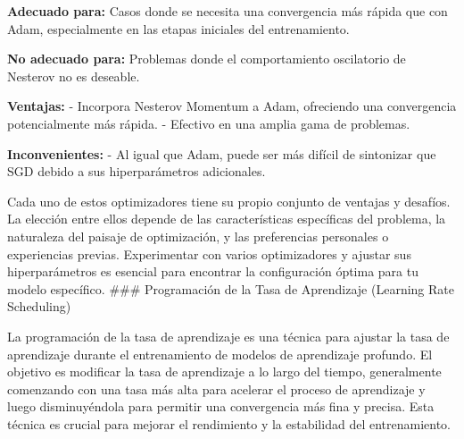 \documentclass[11pt]{article}
\begin{document}
\textbf{Adecuado para:} Casos donde se necesita una convergencia más rápida que
con Adam, especialmente en las etapas iniciales del entrenamiento.

\textbf{No adecuado para:} Problemas donde el comportamiento oscilatorio de
Nesterov no es deseable.

\textbf{Ventajas:} - Incorpora Nesterov Momentum a Adam, ofreciendo una
convergencia potencialmente más rápida. - Efectivo en una amplia gama de
problemas.

\textbf{Inconvenientes:} - Al igual que Adam, puede ser más difícil de
sintonizar que SGD debido a sus hiperparámetros adicionales.

Cada uno de estos optimizadores tiene su propio conjunto de ventajas y
desafíos. La elección entre ellos depende de las características
específicas del problema, la naturaleza del paisaje de optimización, y
las preferencias personales o experiencias previas. Experimentar con
varios optimizadores y ajustar sus hiperparámetros es esencial para
encontrar la configuración óptima para tu modelo específico. \#\#\#
Programación de la Tasa de Aprendizaje (Learning Rate Scheduling)

La programación de la tasa de aprendizaje es una técnica para ajustar la
tasa de aprendizaje durante el entrenamiento de modelos de aprendizaje
profundo. El objetivo es modificar la tasa de aprendizaje a lo largo del
tiempo, generalmente comenzando con una tasa más alta para acelerar el
proceso de aprendizaje y luego disminuyéndola para permitir una
convergencia más fina y precisa. Esta técnica es crucial para mejorar el
rendimiento y la estabilidad del entrenamiento.
\end{document}
